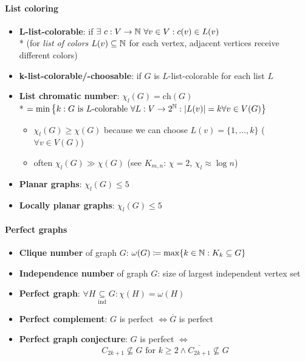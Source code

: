 \paragraph{List coloring}
\begin{itemize}
  \item \textbf{L-list-colorable}: if $ \exists \ c: V \to \mathbb{N} \ \forall v \in V : c(v) \in L(v) $ \\*
  (for \emph{list of colors} $ L(v) \subseteq \mathbb{N} $ for each vertex, adjacent vertices receive different colors) 
  \item \textbf{k-list-colorable/-choosable}: if $ G $ is $ L $-list-colorable for each list $ L $
  \item \textbf{List chromatic number}: $ \chi_l(G) = \text{ch}(G) $ \\* $ = \min\left\{ k : G \text{ is $ L $-colorable } \forall L: V \to 2^{\mathbb{N}}: \vert L(v) \vert = k \forall v \in V(G) \right\} $
  \begin{itemize}
    \item $ \chi_l(G) \geq \chi(G) $ because we can choose $ L(v) = \{ 1, \dots, k \} $ ($ \forall v \in V(G) $) 
    \item often $ \chi_l(G) \gg \chi(G) $ (see $ K_{m,n} $: $ \chi = 2 $, $ \chi_l \approx \log n $)
  \end{itemize}
  \item \textbf{Planar graphs}: $ \chi_l(G) \leq 5 $
  \item \textbf{Locally planar graphs}: $ \chi_l(G) \leq 5 $
\end{itemize}

\paragraph{Perfect graphs}
\begin{itemize}
  \item \textbf{Clique number} of graph $ G $: $ \omega(G) \coloneqq \max\{ k \in \mathbb{N} : K_k \subseteq G \} $
  \item \textbf{Independence number} of graph $ G $: size of largest independent vertex set
  \item \textbf{Perfect graph}: $ \forall H \underset{\text{ind}}{\subseteq} G : \chi(H) = \omega(H) $
  \item \textbf{Perfect complement}: $ G $ is perfect $ \Leftrightarrow \overline{G} $ is perfect
  \item \textbf{Perfect graph conjecture}: $ G $ is perfect $ \Leftrightarrow $
    \begin{equation*}
      C_{2k+1} \not \subseteq G \text{ for } k \geq 2 \wedge \overline{C_{2k+1}} \not \subseteq G
    \end{equation*}
\end{itemize}